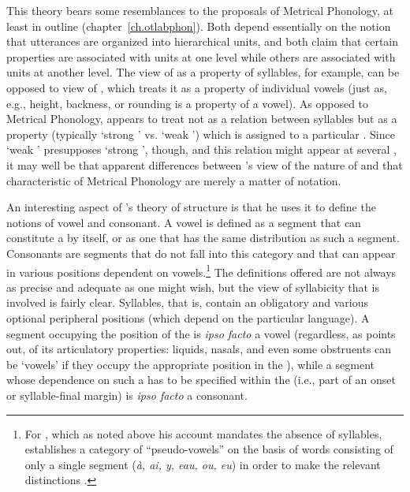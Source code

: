 This theory bears some resemblances to the proposals of
Metrical Phonology, at least in outline
(chapter~\ref{ch.otlabphon}). Both depend essentially on the notion
that utterances are organized into hierarchical units, and both claim
that certain properties are associated with units at one level while
others are associated with units at another level. The view of 
as a property of syllables, for example, can be opposed to
 view of , which treats it as a property of
individual vowels (just as, e.g., height, backness, or rounding is a
property of a vowel). As opposed to Metrical Phonology, {\Hjelmslev}
appears to treat  not as a relation between syllables but as a
property (typically `strong ' vs. `weak ') which is
assigned to a particular . Since `weak ' presupposes
`strong ', though, and this relation might appear at several
, it may well be that apparent differences between {\Hjelmslev}'s
view of the nature of  and that characteristic of Metrical
Phonology are merely a matter of notation.

An interesting aspect of {\Hjelmslev}'s theory of  structure is
that he uses it to define the notions of vowel and consonant. A vowel
is defined as a segment that can constitute a  by itself, or
as one that has the same distribution as such a segment. Consonants
are segments that do not fall into this category and that can appear
in various positions dependent on vowels.\footnote{For , which
  as noted above his account mandates the absence of syllables,
  {\Hjelmslev} establishes a category of ``pseudo-vowels'' on the basis
  of words consisting of only a single segment (\emph{à, ai, y, eau,
    ou, eu}) in order to make the relevant distinctions
  \citep[217]{hjelmslev70:french}.}  The definitions offered are not
always as precise and adequate as one might wish, but the view of
syllabicity that is involved is fairly clear. Syllables, that is,
contain an obligatory  and various optional peripheral
positions (which depend on the particular language). A segment
occupying the position of the  is \emph{ipso facto} a vowel
(regardless, as {\Hjelmslev} points out, of its articulatory properties:
liquids, nasals, and even some obstruents can be `vowels' if they
occupy the appropriate position in the ), while a segment
whose dependence on such a  has to be specified within the
 (i.e., part of an onset or syllable-final margin) is
\emph{ipso facto} a consonant.

